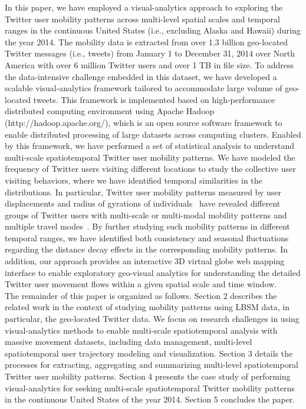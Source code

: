 \documentclass{elsart}
\begin{document}
In this paper, we have employed a visual-analytics approach to exploring the Twitter user mobility patterns across multi-level spatial scales and temporal ranges in the continuous United States (i.e., excluding Alaska and Hawaii) during the year 2014.
The mobility data is extracted from over 1.3 billion geo-located Twitter messages (i.e., tweets) from January 1 to December 31, 2014 over North America with over 6 million Twitter users and over 1 TB in file size.
To address the data-intensive challenge embedded in this dataset, we have developed a scalable visual-analytics framework tailored to accommodate large volume of geo-located tweets. This framework is implemented based on high-performance distributed computing environment using Apache Hadoop (http://hadoop.apache.org/), which is an open source software framework to enable distributed processing of large datasets across computing clusters.
Enabled by this framework, we have performed a set of statistical analysis to understand multi-scale spatiotemporal Twitter user mobility patterns. 
We have modeled the frequency of Twitter users visiting different locations to study the collective user visiting behaviors, where we have identified temporal similarities in the distributions.
In particular, Twitter user mobility patterns measured by user displacements and radius of gyrations of individuals~\cite{gonzalez2008understanding} have revealed different groups of Twitter users with multi-scale or multi-modal mobility patterns and multiple travel modes~\cite{Jurdak2015}.
By further studying such mobility patterns in different temporal ranges, we have identified both consistency and seasonal fluctuations regarding the distance decay effects in the corresponding mobility patterns.
In addition, our approach provides an interactive 3D virtual globe web mapping interface to enable exploratory geo-visual analytics for understanding the detailed Twitter user movement flows within a given spatial scale and time window.\\

The remainder of this paper is organized as follows.
Section 2 describes the related work in the context of studying mobility patterns using LBSM data, in particular, the geo-located Twitter data.
We focus on research challenges in using visual-analytics methods to enable multi-scale spatiotemporal analysis with massive movement datasets, including data management, multi-level spatiotemporal user trajectory modeling and visualization.
Section 3 details the processes for extracting, aggregating and summarizing multi-level spatiotemporal Twitter user mobility patterns.
Section 4 presents the case study of performing visual-analytics for seeking multi-scale spatiotemporal Twitter mobility patterns in the continuous United States of the year 2014.
Section 5 concludes the paper.
\end{document}
